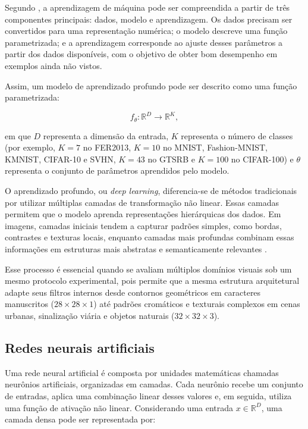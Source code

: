 \documentclass[
    12pt,
    openright,
    oneside,
    a4paper,
    english,
    brazil
]{abntex2}
\begin{document}
Segundo , a aprendizagem de máquina pode ser compreendida a partir de três componentes principais: dados, modelo e aprendizagem. Os dados precisam ser convertidos para uma representação numérica; o modelo descreve uma função parametrizada; e a aprendizagem corresponde ao ajuste desses parâmetros a partir dos dados disponíveis, com o objetivo de obter bom desempenho em exemplos ainda não vistos.

Assim, um modelo de aprendizado profundo pode ser descrito como uma função parametrizada:

\[
f_{\theta}: \mathbb{R}^{D} \rightarrow \mathbb{R}^{K},
\]

em que \(D\) representa a dimensão da entrada, \(K\) representa o número de classes (por exemplo, \(K=7\) no FER2013, \(K=10\) no MNIST, Fashion-MNIST, KMNIST, CIFAR-10 e SVHN, \(K=43\) no GTSRB e \(K=100\) no CIFAR-100) e \(\theta\) representa o conjunto de parâmetros aprendidos pelo modelo.

O aprendizado profundo, ou \textit{deep learning}, diferencia-se de métodos tradicionais por utilizar múltiplas camadas de transformação não linear. Essas camadas permitem que o modelo aprenda representações hierárquicas dos dados. Em imagens, camadas iniciais tendem a capturar padrões simples, como bordas, contrastes e texturas locais, enquanto camadas mais profundas combinam essas informações em estruturas mais abstratas e semanticamente relevantes \cite{LeCun2015,goodfellow2016deep}.

Esse processo é essencial quando se avaliam múltiplos domínios visuais sob um mesmo protocolo experimental, pois permite que a mesma estrutura arquitetural adapte seus filtros internos desde contornos geométricos em caracteres manuscritos (\(28 \times 28 \times 1\)) até padrões cromáticos e texturais complexos em cenas urbanas, sinalização viária e objetos naturais (\(32 \times 32 \times 3\)).

\subsection{Redes neurais artificiais}

Uma rede neural artificial é composta por unidades matemáticas chamadas neurônios artificiais, organizadas em camadas. Cada neurônio recebe um conjunto de entradas, aplica uma combinação linear desses valores e, em seguida, utiliza uma função de ativação não linear. Considerando uma entrada \(x \in \mathbb{R}^{D}\), uma camada densa pode ser representada por:
\end{document}
